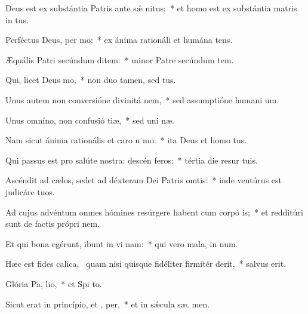 \item Deus est ex substántia Patris ante sǽ nitus:~* et homo est ex substántia matris in  tus.
\item Perféctus Deus, per mo:~* ex ánima rationáli et humána  tens.
\item Æquális Patri secúndum ditem:~* minor Patre secúndum tem.
\item Qui, licet Deus   mo,~* non duo tamen, sed   tus.
\item Unus autem non conversióne divinitá  nem,~* sed assumptióne humani  um.
\item Unus omníno, non confusió tiæ,~* sed uni næ.
\item Nam sicut ánima rationális et caro u  mo:~* ita Deus et homo   tus.
\item Qui passus est pro salúte nostra: descén  feros:~* tértia die resur  tuis.
\item Ascéndit ad cælos, sedet ad déxteram Dei Patris omtis:~* inde ventúrus est judicáre   tuos.
\item Ad cujus advéntum omnes hómines resúrgere habent cum corpó is;~* et redditúri sunt de factis própri nem.
\item Et qui bona egérunt, ibunt in vi nam:~* qui vero mala, in  num.
\item Hæc est fides calica,~\pscross{} quam nisi quisque fidéliter firmitér derit,~* salvus   erit.
\item Glória Pa,  lio,~* et Spi to.
\item Sicut erat in princípio, et ,  per,~* et in sǽcula sæ. men.
